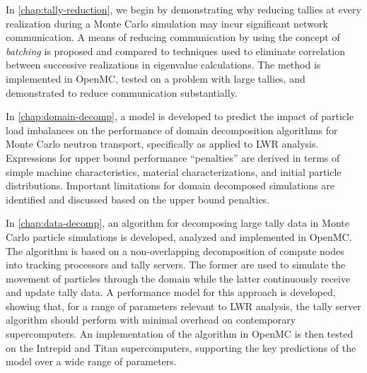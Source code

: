 In \autoref{chap:tally-reduction}, we begin by demonstrating why reducing
tallies at every realization during a Monte Carlo simulation may incur
significant network communication. A means of reducing communication by using
the concept of \emph{batching} is proposed and compared to techniques used to
eliminate correlation between successive realizations in eigenvalue
calculations. The method is implemented in OpenMC, tested on a problem with
large tallies, and demonstrated to reduce communication substantially.

In \autoref{chap:domain-decomp}, a model is developed to predict the impact of
particle load imbalances on the performance of domain decomposition algorithms
for Monte Carlo neutron transport, specifically as applied to LWR
analysis. Expressions for upper bound performance ``penalties'' are derived in
terms of simple machine characteristics, material characterizations, and initial
particle distributions. Important limitations for domain decomposed simulations
are identified and discussed based on the upper bound penalties.

In \autoref{chap:data-decomp}, an algorithm for decomposing large tally data in
Monte Carlo particle simulations is developed, analyzed and implemented in
OpenMC. The algorithm is based on a non-overlapping decomposition of compute
nodes into tracking processors and tally servers. The former are used to
simulate the movement of particles through the domain while the latter
continuously receive and update tally data. A performance model for this
approach is developed, showing that, for a range of parameters relevant to LWR
analysis, the tally server algorithm should perform with minimal overhead on
contemporary supercomputers. An implementation of the algorithm in OpenMC is
then tested on the Intrepid and Titan supercomputers, supporting the key
predictions of the model over a wide range of parameters.
